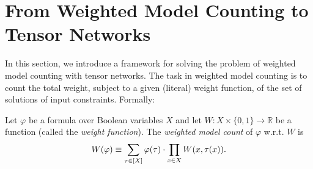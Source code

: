 \section{From Weighted Model Counting to Tensor Networks}
\label{sec:wmc}
In this section, we introduce a framework for solving the problem of weighted model counting with tensor networks. The task in weighted model counting is to count the total weight, subject to a given (literal) weight function, of the set of solutions of input constraints. Formally:
\begin{definition}
  Let $\varphi$ be a formula over Boolean variables $X$ and let $W: X \times \{0,1\} \rightarrow \mathbb{R}$ be a function (called the \emph{weight function}). The \emph{weighted model count} of $\varphi$ w.r.t. $W$ is
  $$W(\varphi) \equiv \sum_{\tau \in [X]} \varphi(\tau) \cdot \prod_{x \in X} W(x, \tau(x)).$$
\end{definition}






